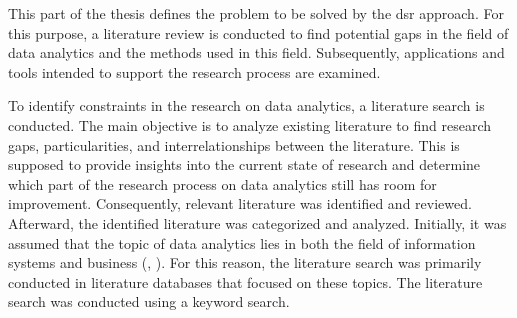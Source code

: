 This part of the thesis defines the problem to be solved by the \ac{dsr} approach. For this purpose, a literature review is conducted to find potential gaps in the field of data analytics and the methods used in this field. Subsequently, applications and tools intended to support the research process are examined.

To identify constraints in the research on data analytics, a literature search is conducted. The main objective is to analyze existing literature to find research gaps, particularities, and interrelationships between the literature. This is supposed to provide insights into the current state of research and determine which part of the research process on data analytics still has room for improvement. Consequently, relevant literature was identified and reviewed. Afterward, the identified literature was categorized and analyzed. Initially, it was assumed that the topic of data analytics lies in both the field of information systems and business (\cite{Abbasi.2016}, \cite{Levina.2005}). For this reason, the literature search was primarily conducted in literature databases that focused on these topics. The literature search was conducted using a keyword search.

